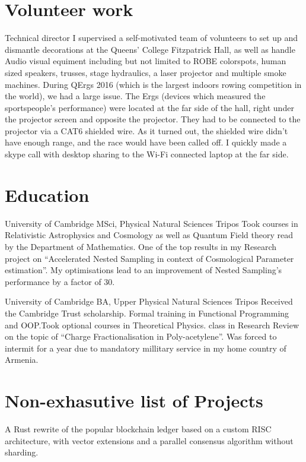 \documentclass{CurriculumVitae}[10pt, condensed]
\begin{document}
{  \section*{Volunteer work} 
  {Technical director} {I supervised a self-motivated team of
    volunteers to set up and dismantle decorations at the Queens'
    College Fitzpatrick Hall, as well as handle Audio visual equiment
    including but not limited to ROBE colorspots, human sized
    speakers, trusses, stage hydraulics, a laser projector and
    multiple smoke machines.  During QErgs 2016 (which is the largest
    indoors rowing competition in the world), we had a large
    issue. The Ergs (devices which measured the sportspeople's
    performance) were located at the far side of the hall, right under
    the projector screen and opposite the projector. They had to be
    connected to the projector via a CAT6 shielded wire. As it turned
    out, the shielded wire didn't have enough range, and the race
    would have been called off.  I quickly made a skype call with
    desktop sharing to the Wi-Fi connected laptop at the far side. }
  \pagebreak
  \section*{Education}%

   {University of Cambridge} {MSci, }
  {Physical Natural Sciences Tripos} {Took courses in Relativistic
    Astrophysics and Cosmology as well as Quantum Field theory read by
    the Department of Mathematics. One of the top results in my
    Research project on ``Accelerated Nested Sampling in context of
    Cosmological Parameter estimation''. My optimisations lead to an
    improvement of Nested Sampling's performance by a factor of 30. }

  {University of Cambridge} {BA, Upper }{Physical Natural Sciences
    Tripos} {Received the Cambridge Trust scholarship. Formal training
    in Functional Programming and OOP.\@ Took optional courses in
    Theoretical Physics.  class in Research Review on the topic
    of ``Charge Fractionalisation in Poly-acetylene''. Was forced to
    intermit for a year due to mandatory millitary service in my home
    country of Armenia. }

  \vfill
  \section*{Non-exhasutive list of Projects}%
  {A Rust rewrite of the popular blockchain ledger based on a custom
    RISC architecture, with vector extensions and a parallel consensus
    algorithm without sharding.
  }

}
\end{document}
